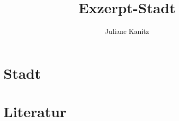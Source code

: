 \documentclass[a4paper,11pt]{scrartcl}
\title{Exzerpt-Stadt}
\subtitle{}
\author{Juliane Kanitz}
\begin{document}
\maketitle
\tableofcontents

\clearscrheadfoot %
\pagestyle{scrheadings} %

\ohead{\leftmark}
\ofoot{\pagemark} %
\setcounter{page}{1} %

\section{Stadt}





\section{Literatur}

 \renewcommand{\refname}{Literatur}
\renewcommand{\bibname}{Literaturverzeichnis}

\printbibliography
\end{document}
